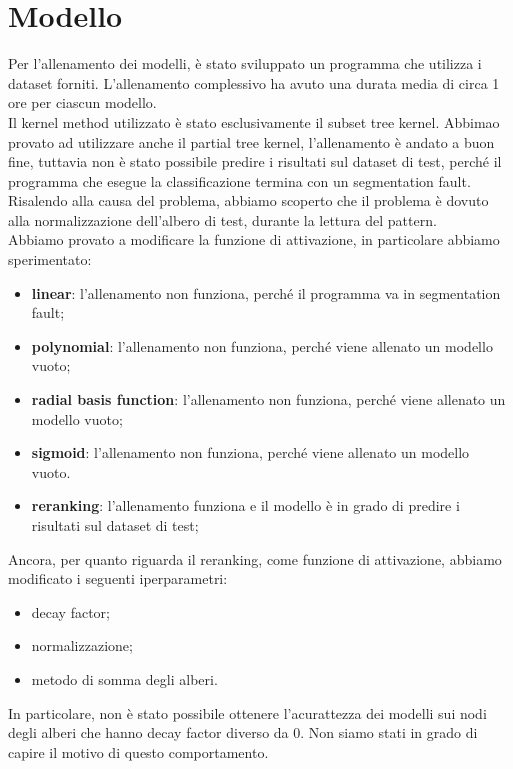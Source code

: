 \section{Modello}

Per l'allenamento dei modelli, è stato sviluppato un programma che utilizza i 
dataset forniti. L'allenamento complessivo ha avuto una durata media di circa 
1 ore per ciascun modello.\\
Il kernel method utilizzato è stato esclusivamente il subset tree 
kernel. Abbimao provato ad utilizzare anche il partial tree kernel,
l'allenamento è andato a buon fine, tuttavia non è stato possibile predire i
risultati sul dataset di test, perché il programma che esegue la classificazione
termina con un segmentation fault. Risalendo alla causa del problema, abbiamo
scoperto che il problema è dovuto alla normalizzazione dell'albero di test,
durante la lettura del pattern.\\

Abbiamo provato a modificare la funzione di attivazione, in particolare abbiamo
sperimentato:
\begin{itemize}
    \item \textbf{linear}: l'allenamento non funziona, perché il programma va in
        segmentation fault;

    \item \textbf{polynomial}: l'allenamento non funziona, perché viene allenato
        un modello vuoto;

    \item \textbf{radial basis function}: l'allenamento non funziona, perché
        viene allenato un modello vuoto;

    \item \textbf{sigmoid}: l'allenamento non funziona, perché viene allenato un
        modello vuoto.

    \item \textbf{reranking}: l'allenamento funziona e il modello è in grado di
        predire i risultati sul dataset di test;
\end{itemize}

Ancora, per quanto riguarda il reranking, come funzione di attivazione, abbiamo
modificato i seguenti iperparametri:
\begin{itemize}
    \item decay factor;
    \item normalizzazione;
    \item metodo di somma degli alberi.
\end{itemize}

In particolare, non è stato possibile ottenere l'acurattezza dei modelli sui
nodi degli alberi che hanno decay factor diverso da 0. Non siamo stati in grado
di capire il motivo di questo comportamento.
